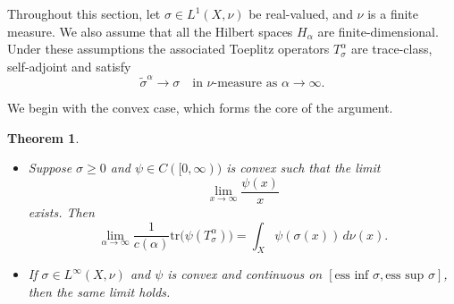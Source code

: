 \documentclass{amsart}
\newtheorem{thm}{Theorem}[section]
\theoremstyle{definition}
\theoremstyle{remark}
\numberwithin{equation}{section}
\newcommand{\tr}{\text{tr}} %
\newcommand{\calF}{\mathcal{F}}
\begin{document}
Throughout this section, let $\sigma \in L^1(X,\nu)$ be real-valued, and $\nu$ is a finite measure. We also assume that all the Hilbert spaces $H_\alpha$ are finite-dimensional. Under these assumptions the associated Toeplitz operators $T_\sigma^\alpha$
are trace-class, self-adjoint and satisfy
\[
\widetilde{\sigma}^\alpha \longrightarrow \sigma
\quad\text{in $\nu$-measure as } \alpha\to\infty.
\]

We begin with the convex case, which forms the core of the argument.

\begin{thm}\label{thm:convex_szego}
\leavevmode
\begin{itemize}
\item[(i)] Suppose $\sigma \ge 0$ and $\psi \in C([0,\infty))$
is convex such that the limit 
\[
\lim_{x\to\infty} \frac{\psi(x)}{x}
\]
exists. Then
\[
\lim_{\alpha\to\infty}
\frac{1}{c(\alpha)}\tr\!\big(\psi(T_\sigma^\alpha)\big)
=
\int_X \psi(\sigma(x))\,d\nu(x).
\]

\item[(ii)] If $\sigma \in L^\infty(X,\nu)$ and
$\psi$ is convex and continuous on
$[\text{ess inf } \sigma, \text{ess sup }\sigma]$, then the same limit holds.
\end{itemize}
\end{thm}
\end{document}
